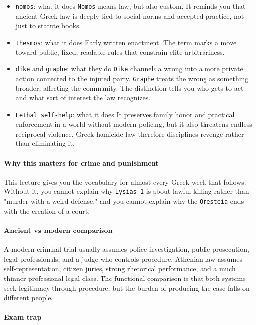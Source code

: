 \documentclass[11pt]{article}
\begin{document}
\begin{itemize}
\item \texttt{nomos}: what it does \texttt{Nomos} means law, but also custom. It reminds you that ancient Greek law is deeply tied to social norms and accepted practice, not just to statute books.
\item \texttt{thesmos}: what it does Early written enactment. The term marks a move toward public, fixed, readable rules that constrain elite arbitrariness.
\item \texttt{dike} and \texttt{graphe}: what they do \texttt{Dike} channels a wrong into a more private action connected to the injured party. \texttt{Graphe} treats the wrong as something broader, affecting the community. The distinction tells you who gets to act and what sort of interest the law recognizes.
\item \texttt{Lethal self-help}: what it does It preserves family honor and practical enforcement in a world without modern policing, but it also threatens endless reciprocal violence. Greek homicide law therefore disciplines revenge rather than eliminating it.
\end{itemize}

\paragraph{Why this matters for crime and punishment}

This lecture gives you the vocabulary for almost every Greek week that follows. Without it, you cannot explain why \texttt{Lysias 1} is about lawful killing rather than "murder with a weird defense," and you cannot explain why the \texttt{Oresteia} ends with the creation of a court.

\paragraph{Ancient vs modern comparison}

A modern criminal trial usually assumes police investigation, public prosecution, legal professionals, and a judge who controls procedure. Athenian law assumes self-representation, citizen juries, strong rhetorical performance, and a much thinner professional legal class. The functional comparison is that both systems seek legitimacy through procedure, but the burden of producing the case falls on different people.

\paragraph{Exam trap}
\end{document}
